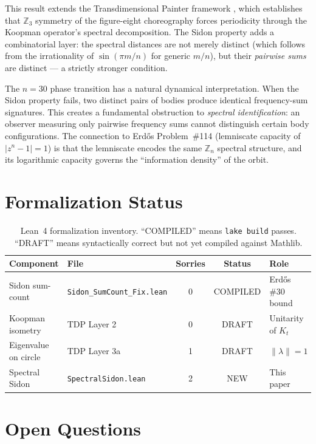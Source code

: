 \documentclass[11pt]{article}
\theoremstyle{definition}
\theoremstyle{remark}
\begin{document}
This result extends the Transdimensional Painter framework \cite{mendoza_tdp}, which establishes that $\mathbb{Z}_3$ symmetry of the figure-eight choreography forces periodicity through the Koopman operator's spectral decomposition. The Sidon property adds a combinatorial layer: the spectral distances are not merely distinct (which follows from the irrationality of $\sin(\pi m/n)$ for generic $m/n$), but their \emph{pairwise sums} are distinct --- a strictly stronger condition.

The $n = 30$ phase transition has a natural dynamical interpretation. When the Sidon property fails, two distinct pairs of bodies produce identical frequency-sum signatures. This creates a fundamental obstruction to \emph{spectral identification}: an observer measuring only pairwise frequency sums cannot distinguish certain body configurations. The connection to Erd\H{o}s Problem~\#114 \cite{mendoza_ehp} (lemniscate capacity of $|z^n - 1| = 1$) is that the lemniscate encodes the same $\mathbb{Z}_n$ spectral structure, and its logarithmic capacity governs the ``information density'' of the orbit.

\section{Formalization Status}

\begin{table}[h]
\centering
\begin{tabular}{llccl}
\toprule
\textbf{Component} & \textbf{File} & \textbf{Sorries} & \textbf{Status} & \textbf{Role} \\
\midrule
Sidon sum-count & \texttt{Sidon\_SumCount\_Fix.lean} & 0 & COMPILED & Erd\H{o}s \#30 bound \\
Koopman isometry & TDP Layer 2 & 0 & DRAFT & Unitarity of $K_t$ \\
Eigenvalue on circle & TDP Layer 3a & 1 & DRAFT & $\|\lambda\| = 1$ \\
Spectral Sidon & \texttt{SpectralSidon.lean} & 2 & NEW & This paper \\
\bottomrule
\end{tabular}
\caption{Lean~4 formalization inventory. ``COMPILED'' means \texttt{lake build} passes. ``DRAFT'' means syntactically correct but not yet compiled against Mathlib.}
\label{tab:lean}
\end{table}

\section{Open Questions}
\end{document}
